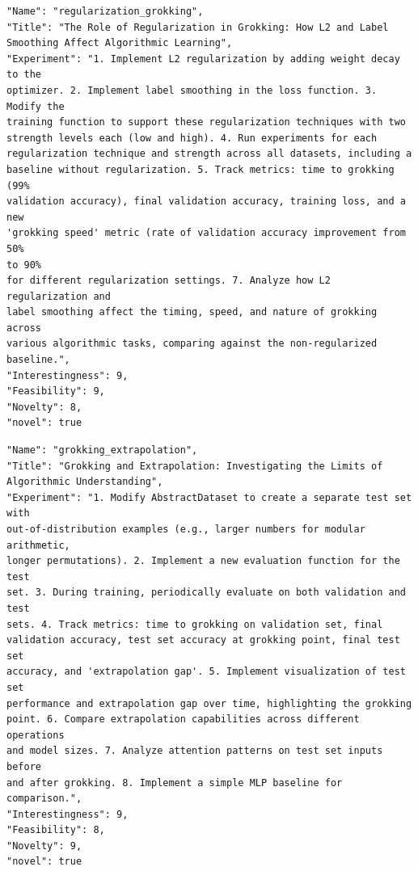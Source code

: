 \begin{tcolorbox}[breakable,colback=blue!5!white, colframe=blue!75!black, title=Idea 11/50 - \texttt{regularization\_grokking}]
\small
\begin{verbatim}
"Name": "regularization_grokking",
"Title": "The Role of Regularization in Grokking: How L2 and Label
Smoothing Affect Algorithmic Learning",
"Experiment": "1. Implement L2 regularization by adding weight decay to the
optimizer. 2. Implement label smoothing in the loss function. 3. Modify the
training function to support these regularization techniques with two
strength levels each (low and high). 4. Run experiments for each
regularization technique and strength across all datasets, including a
baseline without regularization. 5. Track metrics: time to grokking (99%
validation accuracy), final validation accuracy, training loss, and a new
'grokking speed' metric (rate of validation accuracy improvement from 50%
to 90%
for different regularization settings. 7. Analyze how L2 regularization and
label smoothing affect the timing, speed, and nature of grokking across
various algorithmic tasks, comparing against the non-regularized
baseline.",
"Interestingness": 9,
"Feasibility": 9,
"Novelty": 8,
"novel": true
\end{verbatim}
\end{tcolorbox}

\begin{tcolorbox}[breakable,colback=blue!5!white, colframe=blue!75!black, title=Idea 12/50 - \texttt{grokking\_extrapolation}]
\small
\begin{verbatim}
"Name": "grokking_extrapolation",
"Title": "Grokking and Extrapolation: Investigating the Limits of
Algorithmic Understanding",
"Experiment": "1. Modify AbstractDataset to create a separate test set with
out-of-distribution examples (e.g., larger numbers for modular arithmetic,
longer permutations). 2. Implement a new evaluation function for the test
set. 3. During training, periodically evaluate on both validation and test
sets. 4. Track metrics: time to grokking on validation set, final
validation accuracy, test set accuracy at grokking point, final test set
accuracy, and 'extrapolation gap'. 5. Implement visualization of test set
performance and extrapolation gap over time, highlighting the grokking
point. 6. Compare extrapolation capabilities across different operations
and model sizes. 7. Analyze attention patterns on test set inputs before
and after grokking. 8. Implement a simple MLP baseline for comparison.",
"Interestingness": 9,
"Feasibility": 8,
"Novelty": 9,
"novel": true
\end{verbatim}
\end{tcolorbox}


